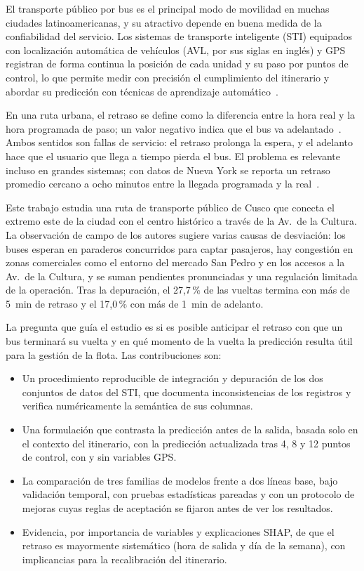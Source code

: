 \documentclass[conference]{IEEEtran}
\begin{document}
El transporte público por bus es el principal modo de movilidad en muchas ciudades latinoamericanas, y su atractivo depende en buena medida de la confiabilidad del servicio. Los sistemas de transporte inteligente (STI) equipados con localización automática de vehículos (AVL, por sus siglas en inglés) y GPS registran de forma continua la posición de cada unidad y su paso por puntos de control, lo que permite medir con precisión el cumplimiento del itinerario y abordar su predicción con técnicas de aprendizaje automático~\cite{alexandre2023,singh2022}.

En una ruta urbana, el retraso se define como la diferencia entre la hora real y la hora programada de paso; un valor negativo indica que el bus va adelantado~\cite{lin1999}. Ambos sentidos son fallas de servicio: el retraso prolonga la espera, y el adelanto hace que el usuario que llega a tiempo pierda el bus. El problema es relevante incluso en grandes sistemas; con datos de Nueva York se reporta un retraso promedio cercano a ocho minutos entre la llegada programada y la real~\cite{rashvand2024}.

Este trabajo estudia una ruta de transporte público de Cusco que conecta el extremo este de la ciudad con el centro histórico a través de la Av.~de la Cultura. La observación de campo de los autores sugiere varias causas de desviación: los buses esperan en paraderos concurridos para captar pasajeros, hay congestión en zonas comerciales como el entorno del mercado San Pedro y en los accesos a la Av.~de la Cultura, y se suman pendientes pronunciadas y una regulación limitada de la operación. Tras la depuración, el 27,7\,\% de las vueltas termina con más de 5~min de retraso y el 17,0\,\% con más de 1~min de adelanto.

La pregunta que guía el estudio es si es posible anticipar el retraso con que un bus terminará su vuelta y en qué momento de la vuelta la predicción resulta útil para la gestión de la flota. Las contribuciones son:
\begin{itemize}
\item Un procedimiento reproducible de integración y depuración de los dos conjuntos de datos del STI, que documenta inconsistencias de los registros y verifica numéricamente la semántica de sus columnas.
\item Una formulación que contrasta la predicción antes de la salida, basada solo en el contexto del itinerario, con la predicción actualizada tras 4, 8 y 12 puntos de control, con y sin variables GPS.
\item La comparación de tres familias de modelos frente a dos líneas base, bajo validación temporal, con pruebas estadísticas pareadas y con un protocolo de mejoras cuyas reglas de aceptación se fijaron antes de ver los resultados.
\item Evidencia, por importancia de variables y explicaciones SHAP, de que el retraso es mayormente sistemático (hora de salida y día de la semana), con implicancias para la recalibración del itinerario.
\end{itemize}
\end{document}
